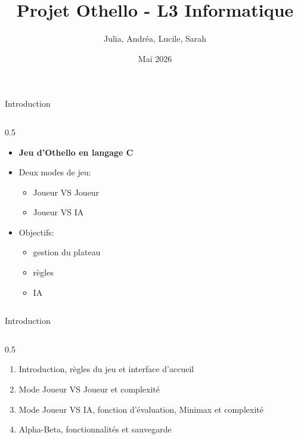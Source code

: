 \documentclass[10pt, aspectratio=169]{beamer}
\title{Projet Othello - L3 Informatique}
\author{Julia, Andréa, Lucile, Sarah}
\date{Mai 2026}
\begin{document}
{ 
\begin{frame}[plain]
    \titlepage
    \centering
\end{frame}
}
\begin{frame}{Introduction}
    \begin{columns}[T]
    \begin{column}{0.5\textwidth}
    \begin{itemize}
        \setlength{\itemsep}{1em} 
        \item \textbf{Jeu d'Othello en langage C}
        \item Deux modes de jeu: 
        \begin{itemize}
            \item Joueur VS Joueur
            \item Joueur VS IA
        \end{itemize}
        \item Objectifs: 
        \begin{itemize}
            \item gestion du plateau
            \item règles
            \item IA
        \end{itemize}
    \end{itemize}
\end{column}
\end{columns}
\end{frame}

\begin{frame}{Introduction}
    \begin{columns}[T]
    \begin{column}{0.5\textwidth}
    \begin{enumerate}
        \setlength{\itemsep}{1em} 
        \item Introduction, règles du jeu et interface d'accueil
        \item Mode Joueur VS Joueur et complexité
        \item Mode Joueur VS IA, fonction d'évaluation, Minimax et complexité
        \item Alpha-Beta, fonctionnalités et sauvegarde
    \end{enumerate}
\end{column}
\end{columns}
\end{frame}
\end{document}
